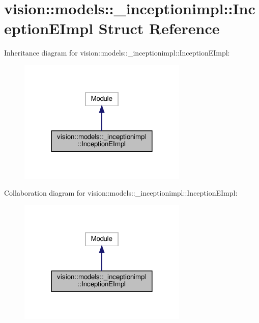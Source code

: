 \hypertarget{structvision_1_1models_1_1__inceptionimpl_1_1InceptionEImpl}{}\section{vision\+:\+:models\+:\+:\+\_\+inceptionimpl\+:\+:Inception\+E\+Impl Struct Reference}
\label{structvision_1_1models_1_1__inceptionimpl_1_1InceptionEImpl}


Inheritance diagram for vision\+:\+:models\+:\+:\+\_\+inceptionimpl\+:\+:Inception\+E\+Impl\+:
\nopagebreak
\begin{figure}[H]
\begin{center}
\leavevmode
\includegraphics[width=228pt]{structvision_1_1models_1_1__inceptionimpl_1_1InceptionEImpl__inherit__graph}
\end{center}
\end{figure}


Collaboration diagram for vision\+:\+:models\+:\+:\+\_\+inceptionimpl\+:\+:Inception\+E\+Impl\+:
\nopagebreak
\begin{figure}[H]
\begin{center}
\leavevmode
\includegraphics[width=228pt]{structvision_1_1models_1_1__inceptionimpl_1_1InceptionEImpl__coll__graph}
\end{center}
\end{figure}
